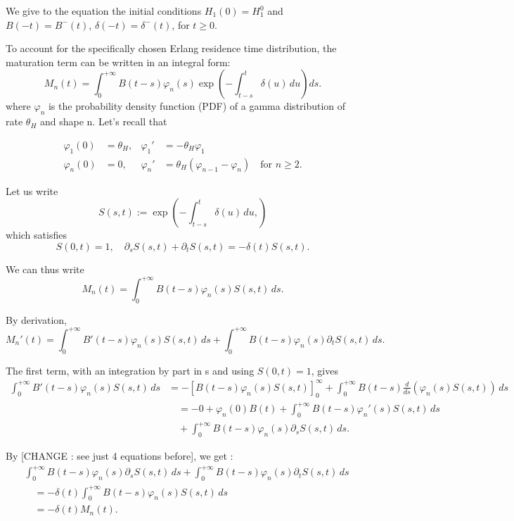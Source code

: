 \documentclass[12pt,a4paper,onecolumn]{article}
\begin{document}
We give to the equation the initial conditions $H_1(0) = H_1^0$ and $B(-t) = B^{-}(t)$, $\delta(-t) = \delta^{-}(t)$, for $t \geq 0$.

To account for the specifically chosen Erlang residence time distribution, the maturation term can be written in an integral form:
\begin{equation}
M_n(t) = \int_0^{+\infty} B(t-s)\varphi_n(s) \exp\left( -\int_{t-s}^{t} \delta(u) \, du \right) ds.
\end{equation}
where $\varphi_n$ is the probability density function (PDF) of a gamma distribution of rate $\theta_H$ and shape n. Let's recall that

\begin{align}
\varphi_1(0) &= \theta_H, & \varphi_1' &= -\theta_H \varphi_1 \\
\varphi_n(0) &= 0, & \varphi_n' &= \theta_H (\varphi_{n-1} - \varphi_n) \quad \text{for } n \geq 2.
\end{align}

Let us write 
\[
S(s, t) := \exp\left( -\int_{t-s}^{t} \delta(u) \, du, \right)
\]
which satisfies
\[
S(0, t) = 1, \quad \partial_s S(s,t) + \partial_t S(s,t) = -\delta(t) S(s,t).
\]

We can thus write 
\[
M_n(t) = \int_0^{+\infty} B(t-s)\varphi_n(s)S(s,t) \, ds.
\]

By derivation,
\begin{equation}
M_n'(t) = \int_0^{+\infty} B'(t-s)\varphi_n(s)S(s,t) \, ds + \int_0^{+\infty} B(t-s)\varphi_n(s) \partial_t S(s,t) \, ds.
\end{equation}

The first term, with an integration by part in s and using $S(0,t) = 1$, gives
\begin{align*}
\int_0^{+\infty} B'(t-s)\varphi_n(s)S(s,t) \, ds &= -[B(t-s) \varphi_n(s) S(s,t) ]_{0}^{\infty} + \int_0^{+\infty} B(t-s)\frac{d}{ds}(\varphi_n(s)S(s,t)) \, ds \\
&\quad = -0 + \varphi_n(0) B(t) + \int_0^{+\infty} B(t-s)\varphi_n'(s) S(s,t) \, ds \\
&\quad + \int_0^{+\infty} B(t-s)\varphi_n(s) \partial_s S(s,t) \, ds.
\end{align*}

By [CHANGE : see just 4 equations before], we get :
\begin{align*}
&\int_0^{+\infty} B(t-s)\varphi_n(s) \partial_s S(s,t) \, ds  + \int_0^{+\infty} B(t-s)\varphi_n(s) \partial_t S(s,t) \, ds \\
&\quad = - \delta(t) \int_0^{+\infty} B(t-s)\varphi_n(s) S(s,t)  \, ds \\
&\quad = - \delta(t) M_n(t).
\end{align*}
\end{document}
